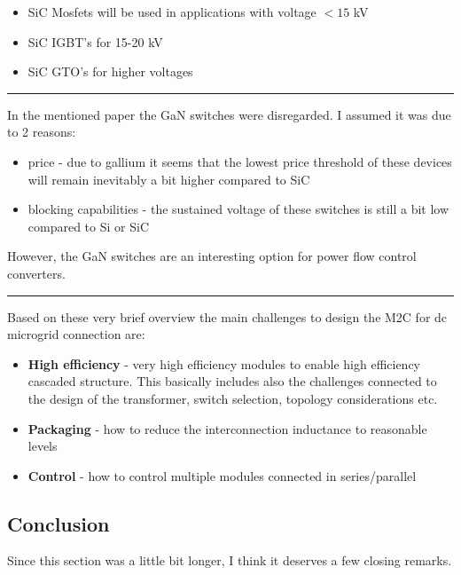 \documentclass[]{scrartcl}
\begin{document}
\begin{itemize}
	\item SiC Mosfets will be used in applications with voltage $<15$ kV
	\item SiC IGBT's for 15-20 kV
	\item SiC GTO's for higher voltages
\end{itemize}
\vspace{5pt}
\hrule
\vspace{5pt}
In the mentioned paper the GaN switches were disregarded. I assumed it was due to 2 reasons:
\begin{itemize}
	\item price - due to gallium it seems that the lowest price threshold of these devices will remain inevitably a bit higher  compared to SiC
	\item blocking capabilities - the sustained voltage of these switches is still a bit low compared to Si or SiC
\end{itemize}
However, the GaN switches are an interesting option for power flow control converters.
\vspace{5pt}
\hrule
\vspace{5pt}
Based on these very brief overview the main challenges to design the M2C for dc microgrid connection are:
\begin{itemize}
	\item \textbf{High efficiency} - very high efficiency modules to enable high efficiency cascaded structure. This basically includes also the challenges connected to the design of the transformer, switch selection, topology considerations etc. 
	\item \textbf{Packaging} - how to reduce the interconnection inductance to reasonable levels
	\item \textbf{Control} - how to control multiple modules connected in series/parallel 
\end{itemize}

\subsection{Conclusion}
Since this section was a little bit longer,  I think it deserves a few closing remarks. 
\end{document}
